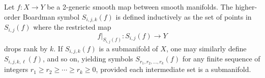 Let $f: X \to Y$ be a 2-generic smooth map between smooth manifolds. The higher-order Boardman symbol $S_{i,j,k}(f)$ is defined inductively as the set of points in $S_{i,j}(f)$ where the restricted map
$$f|_{S_{i,j}(f)}: S_{i,j}(f) \to Y$$
drops rank by $k$. If $S_{i,j,k}(f)$ is a submanifold of $X$, one may similarly define $S_{i,j,k,\ell}(f)$, and so on, yielding symbols $S_{r_1,r_2,\ldots,r_k}(f)$ for any finite sequence of integers $r_1 \ge r_2 \ge \cdots \ge r_k \ge 0$, provided each intermediate set is a submanifold.
